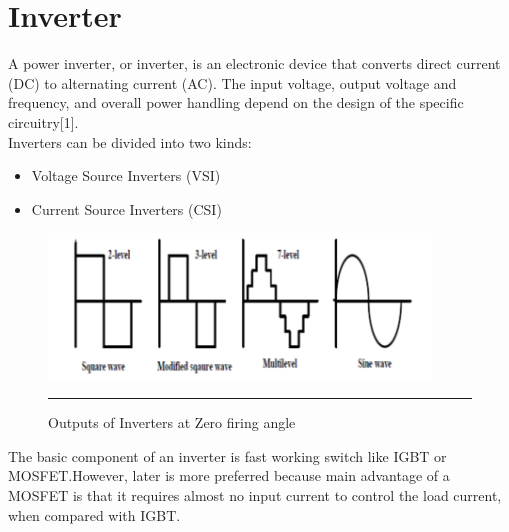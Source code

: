 \section{Inverter}
A power inverter, or inverter, is an electronic device that converts direct current (DC) to alternating current (AC).
The input voltage, output voltage and frequency, and overall power handling depend on the design of the specific circuitry[1].\\ 
Inverters can be divided into two kinds:
\begin{itemize}
\item Voltage Source Inverters (VSI)
\item Current Source Inverters (CSI)
\end{itemize}
\begin{figure}[htbp]
	\centering
		\includegraphics[width = 4in]{./Figures/Picture1.pdf}
		\rule{35em}{5pt}
	\caption{Outputs of Inverters at Zero firing angle}
	\label{fig:1}
\end{figure}
The basic component of an inverter is fast working switch like
IGBT or MOSFET.However, later is more preferred because main 
advantage of a MOSFET is that it requires almost no input current 
to control the load current, when compared with IGBT.
